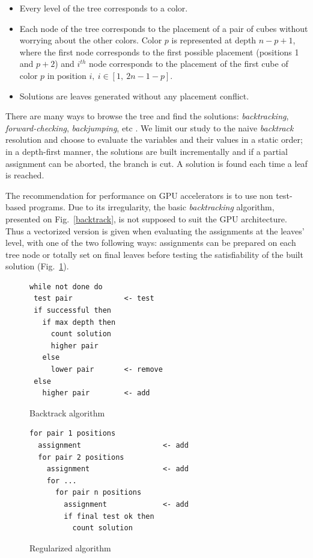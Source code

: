 \begin{itemize}   
\item Every level of the tree corresponds to a color.
\item Each node of the tree corresponds to the placement of a pair of cubes without worrying about the other colors. Color $p$ is represented at depth $n-p+1$, where the first node corresponds to the first possible placement (positions 1 and $p+2$) and $i^{th}$ node corresponds to the placement of the first cube of color $p$ in position $i, \ i \in [1, \ 2n-1-p]$.
\item Solutions are leaves generated without any placement conflict.
\end{itemize}

There are many ways to browse the tree and find the solutions: \emph{backtracking}, \emph{forward-checking}, \emph{backjumping}, etc \cite{prosser93hybrid}. 
We limit our study to the naive \emph{backtrack} resolution and choose to evaluate the variables and their values in a static order; in a depth-first manner, the solutions are built incrementally and if a partial assignment can be aborted, the branch is cut. A solution is found each time a leaf is reached.

The recommendation for performance on GPU accelerators is to use non test-based programs.
Due to its irregularity, the basic \emph{backtracking} algorithm, presented on Fig.~\ref{backtrack}, is not supposed to suit the GPU architecture.
Thus a vectorized version is given when evaluating the assignments at the leaves' level, with one of the two following ways: assignments can be prepared on each tree node or totally set on final leaves before testing the satisfiability of the built solution (Fig.~\ref{regularized}).

\begin{figure}[htb]
\begin{minipage}[b]{0.45\linewidth}
\footnotesize
\begin{verbatim}
while not done do
 test pair            <- test
 if successful then 
   if max depth then
     count solution
     higher pair	                  
   else
     lower pair       <- remove
 else
   higher pair        <- add
\end{verbatim}
\caption{Backtrack algorithm}\label{backtrack}
\end{minipage}
\begin{minipage}[b]{0.45\linewidth}
\footnotesize
\begin{verbatim}
for pair 1 positions
  assignment                   <- add
  for pair 2 positions
    assignment                 <- add
    for ...
      for pair n positions
        assignment             <- add
        if final test ok then  
          count solution
\end{verbatim}
\caption{Regularized algorithm}\label{regularized}
\end{minipage}
\end{figure}

